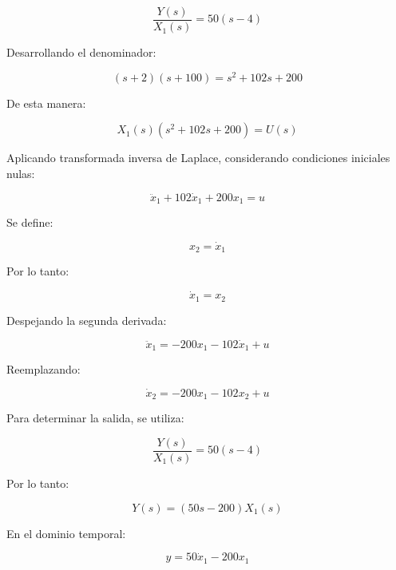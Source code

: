 \documentclass[12pt,a4paper]{article}
\begin{document}
\begin{equation}\frac{Y(s)}{X_1(s)}=50(s-4)\end{equation}

Desarrollando el denominador:

\begin{equation}(s+2)(s+100)=s^2+102s+200\end{equation}

De esta manera:

\begin{equation}X_1(s)(s^2+102s+200)=U(s)\end{equation}

Aplicando transformada inversa de Laplace, considerando condiciones iniciales nulas:

\begin{equation}\ddot{x}_1+102\dot{x}_1+200x_1=u\end{equation}

Se define:

\begin{equation}x_2=\dot{x}_1\end{equation}

Por lo tanto:

\begin{equation}\dot{x}_1=x_2\end{equation}

Despejando la segunda derivada:

\begin{equation}\ddot{x}_1=-200x_1-102\dot{x}_1+u\end{equation}

Reemplazando:

\begin{equation}\dot{x}_2=-200x_1-102x_2+u\end{equation}

Para determinar la salida, se utiliza:

\begin{equation}\frac{Y(s)}{X_1(s)}=50(s-4)\end{equation}

Por lo tanto:

\begin{equation}Y(s)=(50s-200)X_1(s)\end{equation}

En el dominio temporal:

\begin{equation}y=50\dot{x}_1-200x_1\end{equation}
\end{document}
